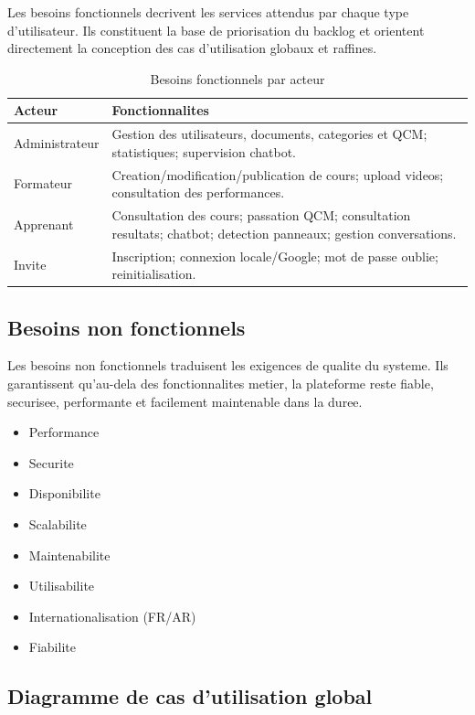 \documentclass[a4paper,12pt]{report}
\begin{document}
Les besoins fonctionnels decrivent les services attendus par chaque type
d'utilisateur. Ils constituent la base de priorisation du backlog et orientent
directement la conception des cas d'utilisation globaux et raffines.

\begin{table}[H]
  \centering
  \caption{Besoins fonctionnels par acteur}
  \label{tab:bf}
  \begin{tabular}{|p{3.2cm}|p{10cm}|}
    \hline
    \textbf{Acteur} & \textbf{Fonctionnalites} \\
    \hline
    Administrateur & Gestion des utilisateurs, documents, categories et QCM; statistiques; supervision chatbot. \\
    \hline
    Formateur & Creation/modification/publication de cours; upload videos; consultation des performances. \\
    \hline
    Apprenant & Consultation des cours; passation QCM; consultation resultats; chatbot; detection panneaux; gestion conversations. \\
    \hline
    Invite & Inscription; connexion locale/Google; mot de passe oublie; reinitialisation. \\
    \hline
  \end{tabular}
\end{table}

\subsection{Besoins non fonctionnels}

Les besoins non fonctionnels traduisent les exigences de qualite du systeme.
Ils garantissent qu'au-dela des fonctionnalites metier, la plateforme reste
fiable, securisee, performante et facilement maintenable dans la duree.

\begin{itemize}
  \item Performance
  \item Securite
  \item Disponibilite
  \item Scalabilite
  \item Maintenabilite
  \item Utilisabilite
  \item Internationalisation (FR/AR)
  \item Fiabilite
\end{itemize}

\subsection{Diagramme de cas d'utilisation global}
\end{document}
